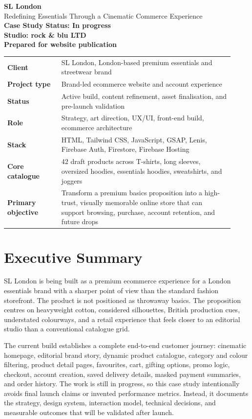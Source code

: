 \documentclass[11pt,a4paper]{article}
\newcommand{\project}{SL London}
\newcommand{\studio}{rock \& blu LTD}
\newcommand{\status}{In progress}
\newcommand{\role}{Strategy, art direction, UX/UI, front-end build, ecommerce architecture}
\newcommand{\stack}{HTML, Tailwind CSS, JavaScript, GSAP, Lenis, Firebase Auth, Firestore, Firebase Hosting}
\begin{document}
\begin{center}
    {\Huge \textbf{\project}}\\[0.35em]
    {\Large Redefining Essentials Through a Cinematic Commerce Experience}\\[1.2em]
    \textbf{Case Study Status: \status}\\
    \textbf{Studio: \studio}\\
    \textbf{Prepared for website publication}
\end{center}

\vspace{1.25em}

\begin{tabular}{>{\bfseries}p{0.22\linewidth} p{0.70\linewidth}}
Client & \project, London-based premium essentials and streetwear brand \\
Project type & Brand-led ecommerce website and account experience \\
Status & Active build, content refinement, asset finalisation, and pre-launch validation \\
Role & \role \\
Stack & \stack \\
Core catalogue & 42 draft products across T-shirts, long sleeves, oversized hoodies, essentials hoodies, sweatshirts, and joggers \\
Primary objective & Transform a premium basics proposition into a high-trust, visually memorable online store that can support browsing, purchase, account retention, and future drops \\
\end{tabular}

\section{Executive Summary}

\project{} is being built as a premium ecommerce experience for a London essentials brand with a sharper point of view than the standard fashion storefront. The product is not positioned as throwaway basics. The proposition centres on heavyweight cotton, considered silhouettes, British production cues, understated colourways, and a retail experience that feels closer to an editorial studio than a conventional catalogue grid.

The current build establishes a complete end-to-end customer journey: cinematic homepage, editorial brand story, dynamic product catalogue, category and colour filtering, product detail pages, favourites, cart, gifting options, promo logic, checkout, account creation, saved delivery details, masked payment summaries, and order history. The work is still in progress, so this case study intentionally avoids final launch claims or invented performance metrics. Instead, it documents the strategy, design system, interaction model, technical decisions, and measurable outcomes that will be validated after launch.
\end{document}
